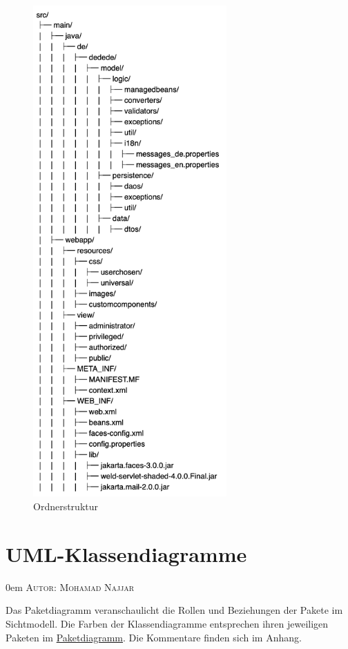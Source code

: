\documentclass{article}
\makeatletter
\newcommand{\sectionauthor}[1]{
	{\parindent 0em \large \scshape Autor: #1 \par \nobreak \vspace*{1em}}
	\@afterheading
}
\makeatother
\begin{document}
\begin{figure}[H]
\centering
\includegraphics[width = 20em]{FileStructure}
\caption{Ordnerstruktur}
\end{figure}

\section{UML-Klassendiagramme}
\sectionauthor{Mohamad Najjar}


Das Paketdiagramm veranschaulicht  die Rollen und Beziehungen der Pakete im Sichtmodell. Die Farben der Klassendiagramme entsprechen ihren jeweiligen Paketen im \hyperlink{Pakete}{Paketdiagramm}. Die Kommentare finden sich im Anhang.
\end{document}
